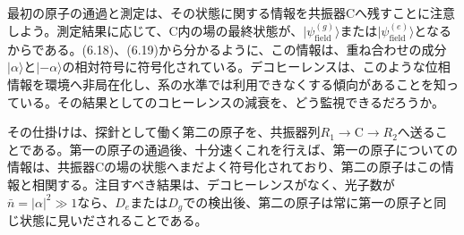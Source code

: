 最初の原子の通過と測定は、その状態に関する情報を共振器Cへ残すことに注意しよう。測定結果に応じて、C内の場の最終状態が、$|\psi_{\mathrm{field}}^{(g)}\rangle$または$|\psi_{\mathrm{field}}^{(e)}\rangle$となるからである。(6.18)、(6.19)から分かるように、この情報は、重ね合わせの成分$|\alpha\rangle$と$|-\alpha\rangle$の相対符号に符号化されている。デコヒーレンスは、このような位相情報を環境へ非局在化し、系の水準では利用できなくする傾向があることを知っている。その結果としてのコヒーレンスの減衰を、どう監視できるだろうか。

その仕掛けは、探針として働く第二の原子を、共振器列$R_1\to\mathrm C\to R_2$へ送ることである。第一の原子の通過後、十分速くこれを行えば、第一の原子についての情報は、共振器Cの場の状態へまだよく符号化されており、第二の原子はこの情報と相関する。注目すべき結果は、デコヒーレンスがなく、光子数が$\bar n=|\alpha|^2\gg1$なら、$D_e$または$D_g$での検出後、第二の原子は常に第一の原子と同じ状態に見いだされることである。

